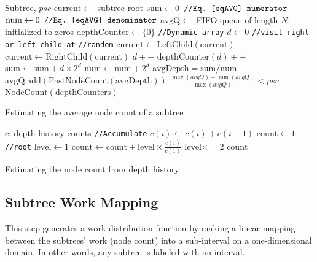 \documentclass[conference,compsoc]{IEEEtran}
\begin{document}
\begin{algorithm}
	\begin{algorithmic}[1]
		\REQUIRE Subtree, $ \mathit{psc} $
		\STATE $ \mathrm{current}\gets $ subtree root
		\STATE $ \mathrm{sum} \gets 0 \texttt{	//Eq.~\ref{eqAVG} numerator} $ 
		\STATE $ \mathrm{num} \gets 0 \texttt{	//Eq.~\ref{eqAVG} denominator} $
		\STATE $\mathrm{avgQ} \gets$ FIFO queue of length $ N $, initialized to zeros \label{lineQ}
		\STATE $ \mathrm{depthCounter} \gets \{0\} $ \texttt{//Dynamic array}
		\REPEAT \label{lineA}
		\STATE $ d \gets 0 $
		\STATE \texttt{//visit right or left child at} \STATE \texttt{//random}
		\STATE $ \mathrm{current} \gets \mathrm{LeftChild(current)} $
		\ELSE
		\STATE  $ \mathrm{current} \gets \mathrm{RightChild(current)} $
		\ENDIF
		\STATE $ d++ $
		\ENDWHILE
		\STATE $ \mathrm{depthCounter}(d)++$
		\STATE $ \mathrm{sum} \gets \mathrm{sum} +  d \times 2^d$
		\STATE $ \mathrm{num} \gets \mathrm{num} +  2^d $
		\STATE $ \mathrm{avgDepth} = \mathrm{sum/num} $ \label{lineAvgDepth}
		\STATE $ \mathrm{avgQ.add(\mathrm{FastNodeCount(avgDepth)})} $
		\UNTIL $\frac{\max(avgQ)-\min(avgQ)}{\max(avgQ)} < psc $\label{lineB}
		\RETURN $ \mathrm{NodeCount(depthCounters)} $
	\end{algorithmic}
	\caption{Estimating the average node count of a subtree}
	\label{algRandomProbe}
\end{algorithm}
\begin{algorithm}
	\begin{algorithmic}[1]
		\REQUIRE $ c $: depth history counts
		\STATE \texttt{//Accumulate}
		\STATE $ c(i) \gets c(i) +c(i+1) $
		\ENDFOR
		\STATE $ \mathrm{count} \gets 1 $ \texttt{//root}
		\STATE $ \mathrm{level} \gets 1 $
		\STATE $ \mathrm{count} \gets \mathrm{count} + \mathrm{level} \times \frac{c(i)}{c(1)}$
		\STATE $ \mathrm{level} \times= 2 $
		\ENDFOR
		\RETURN	$ \mathrm{count} $
	\end{algorithmic}
	\caption{Estimating the node count from depth history}
	\label{algCountEstimator}
\end{algorithm}
\subsection{Subtree Work Mapping}
This step generates a work distribution function by making a linear mapping between the subtrees' work (node count) into a sub-interval on a one-dimensional domain. In other words, any subtree is labeled with an interval.
\end{document}
